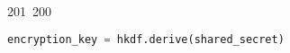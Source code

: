 201~200~\documentclass{article}
\begin{document}
\begin{lstlisting}[language=Python, caption=Shared Secret Computation and Encryption Key Derivation]
	                                                                                                                                                                                                                                                                                                	                                                                                                                                        	    	                                                                                                	                                                                                                                                                                                                                                                                                                                                	                                                                        	                                                                        	                                                                                                                                        	                                                                                                                                                                                                                        	                                                encryption_key = hkdf.derive(shared_secret)
	                                                                                                                                                                                                                                                                                                	                                                                                                                                        	    	                                                                                                	                                                                                                                                                                                                                                                                                                                                	                                                                        	                                                                        	                                                                                                                                        	                                                                                                                                                                                                                        	                                                    return encryption_key

\end{lstlisting}
\end{document}

